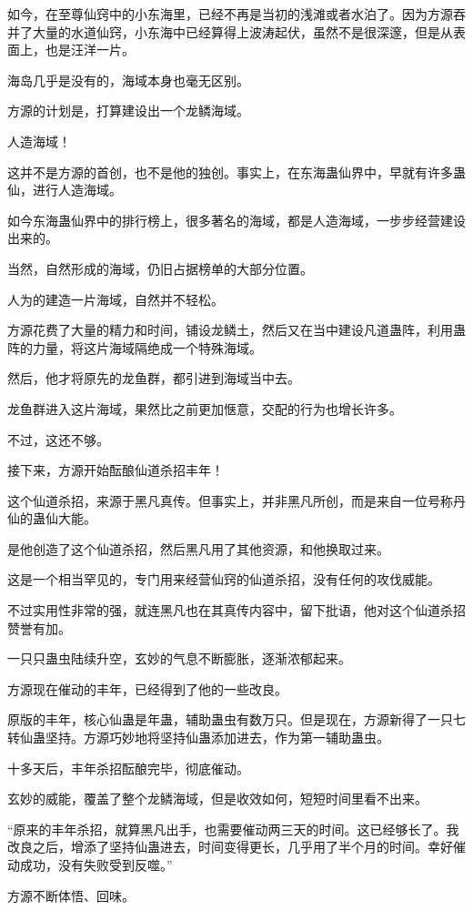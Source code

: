 \begin{this_body}
如今，在至尊仙窍中的小东海里，已经不再是当初的浅滩或者水泊了。因为方源吞并了大量的水道仙窍，小东海中已经算得上波涛起伏，虽然不是很深邃，但是从表面上，也是汪洋一片。

海岛几乎是没有的，海域本身也毫无区别。

方源的计划是，打算建设出一个龙鳞海域。

人造海域！

这并不是方源的首创，也不是他的独创。事实上，在东海蛊仙界中，早就有许多蛊仙，进行人造海域。

如今东海蛊仙界中的排行榜上，很多著名的海域，都是人造海域，一步步经营建设出来的。

当然，自然形成的海域，仍旧占据榜单的大部分位置。

人为的建造一片海域，自然并不轻松。

方源花费了大量的精力和时间，铺设龙鳞土，然后又在当中建设凡道蛊阵，利用蛊阵的力量，将这片海域隔绝成一个特殊海域。

然后，他才将原先的龙鱼群，都引进到海域当中去。

龙鱼群进入这片海域，果然比之前更加惬意，交配的行为也增长许多。

不过，这还不够。

接下来，方源开始酝酿仙道杀招丰年！

这个仙道杀招，来源于黑凡真传。但事实上，并非黑凡所创，而是来自一位号称丹仙的蛊仙大能。

是他创造了这个仙道杀招，然后黑凡用了其他资源，和他换取过来。

这是一个相当罕见的，专门用来经营仙窍的仙道杀招，没有任何的攻伐威能。

不过实用性非常的强，就连黑凡也在其真传内容中，留下批语，他对这个仙道杀招赞誉有加。

一只只蛊虫陆续升空，玄妙的气息不断膨胀，逐渐浓郁起来。

方源现在催动的丰年，已经得到了他的一些改良。

原版的丰年，核心仙蛊是年蛊，辅助蛊虫有数万只。但是现在，方源新得了一只七转仙蛊坚持。方源巧妙地将坚持仙蛊添加进去，作为第一辅助蛊虫。

十多天后，丰年杀招酝酿完毕，彻底催动。

玄妙的威能，覆盖了整个龙鳞海域，但是收效如何，短短时间里看不出来。

“原来的丰年杀招，就算黑凡出手，也需要催动两三天的时间。这已经够长了。我改良之后，增添了坚持仙蛊进去，时间变得更长，几乎用了半个月的时间。幸好催动成功，没有失败受到反噬。”

方源不断体悟、回味。


\end{this_body}
